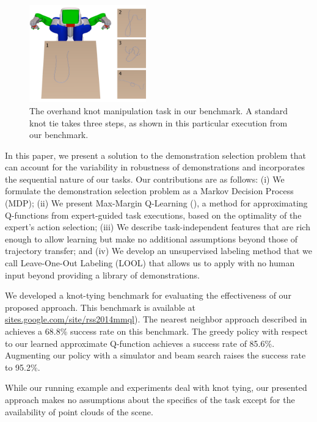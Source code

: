 \begin{figure}[t]
  \centering
    \noindent
    \includegraphics[width=0.45\textwidth]{figures/knot_steps_num.png}
  \caption{The overhand knot manipulation task in our benchmark.
           A standard knot tie takes three steps, as shown in this
           particular execution from our benchmark.}
  \label{fig:knot_steps}
\end{figure}

In this paper, we present a solution to the demonstration selection problem that
can account for the variability in robustness of demonstrations and incorporates the
sequential nature of our tasks. Our contributions are as follows:
(i) We formulate the demonstration selection problem as a Markov Decision
Process (MDP); (ii) We present Max-Margin Q-Learning (\mmql{}), a method for
approximating Q-functions from expert-guided task executions, based on the optimality
of the expert's action selection; (iii) We describe task-independent
features that are rich enough to allow learning but make no additional
assumptions beyond those of trajectory transfer; and (iv) We develop an unsupervised
labeling method that we call Leave-One-Out Labeling (LOOL) that allows
us to apply \mmql{} with no human input beyond providing a library of demonstrations.

We developed a knot-tying benchmark for evaluating the effectiveness of
our proposed approach.   This benchmark is available at
\href{https://sites.google.com/site/rss2014mmql}{sites.google.com/site/rss2014mmql}). The
nearest neighbor approach described in \citet{Schulmanetal_ISRR2013} achieves a
68.8\% success rate on this benchmark.  The greedy policy with respect to our learned
approximate Q-function achieves a success rate of 85.6\%. Augmenting our
policy with a simulator and beam search raises the success rate to 95.2\%.

While our running example and experiments deal with knot tying, our presented
\mmql{} approach makes no assumptions about the
specifics of the task except for the availability of point clouds of
the scene.
